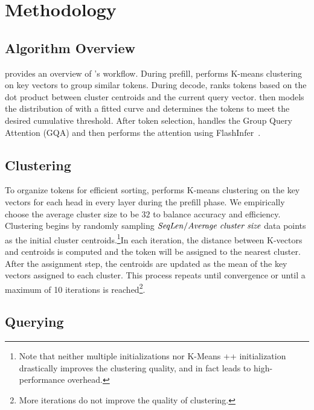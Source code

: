 \section{Methodology}
\label{sec:method}















\subsection{Algorithm Overview}
\label{sec:methodology:overview}
 provides an overview of \sys's workflow. During prefill,  \sys performs K-means clustering on key vectors to group similar tokens. During decode, \sys ranks tokens based on the dot product between cluster centroids and the current query vector. \sys then models the distribution of \as{} with a fitted curve and determines the tokens to meet the desired cumulative \as{} threshold. After token selection, \sys handles the Group Query Attention (GQA) and then performs the attention using FlashInfer~\cite{ye2025flashinfer}.


\subsection{Clustering}
To organize tokens for efficient sorting, \sys performs K-means clustering on the key vectors for each head in every layer during the prefill phase. We empirically choose the average cluster size to be $32$ to balance accuracy and efficiency. Clustering begins by randomly sampling $\text{\textit{SeqLen}} / \text{\textit{Average cluster size}}$ data points as the initial cluster centroids.\footnote{Note that neither multiple initializations nor K-Means ++ initialization drastically improves the clustering quality, and in fact leads to high-performance overhead.}In each iteration, the distance between K-vectors and centroids is computed and the token will be assigned to the nearest cluster. After the assignment step, the centroids are updated as the mean of the key vectors assigned to each cluster. This process repeats until convergence or until a maximum of 10 iterations is reached\footnote{More iterations do not improve the quality of clustering.}. 

\subsection{Querying}

